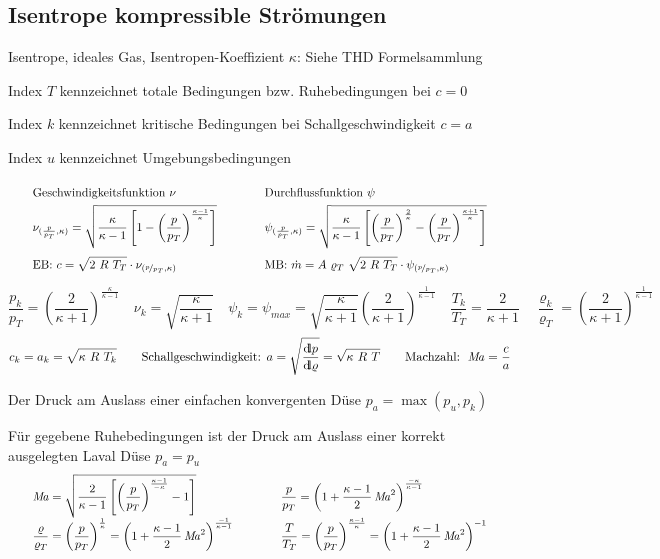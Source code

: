 \subsection{Isentrope kompressible Strömungen}
	Isentrope, ideales Gas, Isentropen-Koeffizient $\kappa$: Siehe THD Formelsammlung

	Index $ T $ kennzeichnet totale Bedingungen bzw. Ruhebedingungen bei $ c = 0 $

	Index $ k $ kennzeichnet kritische Bedingungen bei Schallgeschwindigkeit $ c = a $

	Index $ u $ kennzeichnet Umgebungsbedingungen
%
	\skipabove{0pt}
		\[ \arraycolsep=2em\def\arraystretch{2}
		\begin{array}{ll}
			  \text{Geschwindigkeitsfunktion }  \nu & \text{Durchflussfunktion }  \psi
			\\
			   \nu_{(\frac{p}{p_T},\kappa)} =
			  	\sqrt{\dfrac{\kappa}{\kappa-1}
			  		\left[1 -
			  			\left(\dfrac{p}{p_T}\right)
			  				^{\frac{\kappa-1}{\kappa}}
			  		\right]}
			&  \psi_{(\frac{p}{p_T},\kappa)} =
				\sqrt{ \dfrac{\kappa}{\kappa-1}
					\left[
						\left(\dfrac{p}{p_T}\right)
							^{\frac{2}{\kappa}}
							-
						\left(\dfrac{p}{p_T}\right)
							^{\frac{\kappa+1}{\kappa}}
					\right]}
			\\
			  \text{EB: } c = \displaystyle\sqrt{2\ R\ T_T} \cdot \nu_{(\nicefrac{p}{p_T},\kappa)}
			& \text{MB: } \dot{m} = A\ \varrho_T\ \displaystyle\sqrt{2\ R\ T_T} \cdot \psi_{(\nicefrac{p}{p_T},\kappa)}
		\end{array}\]
%
	\skipabove{0pt}
	\[
		\dfrac{p_k}{p_T} =
			\left(\dfrac{2}{\kappa+1}\right)
				^{\frac{\kappa}{\kappa-1}}
	\quad
		\nu_k = \sqrt{\dfrac{\kappa}{\kappa+1}}
	\quad
		\psi_k = \psi_{max} =
			\sqrt{\dfrac{\kappa}{\kappa+1}}
			\left(\dfrac{2}{\kappa+1}\right)
				^{\frac{1}{\kappa-1}}
	\quad
		\dfrac{T_k}{T_T} = \dfrac{2}{\kappa + 1}
	\quad
		\dfrac{\varrho_k}{\varrho_T} =
			\left(\dfrac{2}{\kappa+1}\right)
				^{\frac{1}{\kappa-1}}
	 \]
%
	\[
		c_k = a_k = \sqrt{\kappa \ R\ T_k}
	\qquad
		\text{Schallgeschwindigkeit: }
		a = \sqrt{\dfrac{{\operatorname{d\!l}} p}{{\operatorname{d\!l}}\varrho}}
			= \sqrt{\kappa \ R\ T}
	\qquad
		\text{Machzahl: }
		\operatorname{\mathit{M\kern-.20em a}} = \dfrac{c}{a}
	 \]

	Der Druck am Auslass einer einfachen konvergenten Düse $ p_a = \max(p_u, p_k) $

	Für gegebene Ruhebedingungen ist der Druck am Auslass einer korrekt ausgelegten Laval Düse $ p_a = p_u  $
%
	\skipabove{10pt}
	\[ \arraycolsep=2em\def\arraystretch{2}
	\begin{array}{ll}
		\Mach  =
		\sqrt{\dfrac{2}{\kappa-1}
			\left[\left(
				\dfrac{p}{p_T}
				\right)
					^{\frac{\kappa-1}{- \kappa}} - 1
			\right]}
		&
		\dfrac{p}{p_T}  =
			\left( 1 +
				\dfrac{\kappa-1}{2}  \Mach^2
			\right)
				^{\frac{- \kappa}{\kappa - 1}}
	\\
		\dfrac{\varrho}{\varrho_T}  =
		\left( \dfrac{p}{p_T} \right)
			^{\frac{1}{\kappa}} =
		\left( 1 +
			\dfrac{\kappa - 1}{2}  \Mach^2
		\right)
			^{\frac{- 1}{\kappa - 1}}
		&
		\dfrac{T}{T_T}  =
		\left( \dfrac{p}{p_T} \right)
			^{\frac{\kappa-1}{\kappa}} =
		\left( 1 +
			\dfrac{\kappa-1}{2}  \Mach^2
		\right)
			^{-1}
	\end{array}\]

